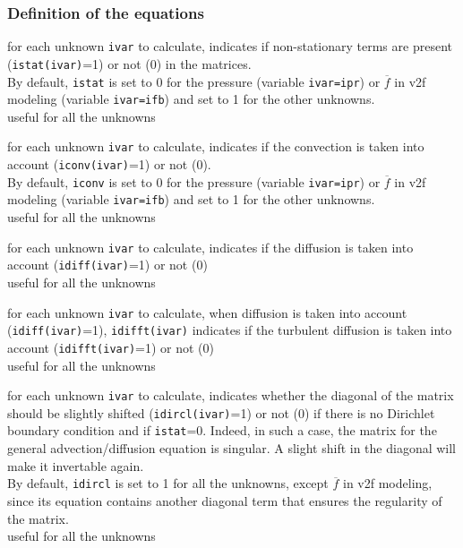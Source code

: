 \subsubsection{Definition of the equations}

{for each unknown {\tt ivar} to calculate, indicates if
non-stationary terms are present ({\tt istat(ivar)}=1) or not (0) in the matrices.\\
By default, {\tt istat} is set to 0 for the pressure (variable {\tt ivar=ipr})
or $\overline{f}$ in v2f modeling (variable {\tt ivar=ifb}) and set to
1 for the other unknowns.\\
useful for all the unknowns}

{for each unknown {\tt ivar} to calculate, indicates if the
convection is taken into account ({\tt iconv(ivar)}=1) or not (0).\\
By default, {\tt iconv} is set to 0 for the pressure (variable {\tt ivar=ipr})
or $\overline{f}$ in v2f modeling (variable {\tt ivar=ifb}) and set to
1 for the other unknowns.\\
useful for all the unknowns}

{for each unknown {\tt ivar} to calculate, indicates if the
diffusion is taken into account ({\tt idiff(ivar)}=1) or not (0)\\
useful for all the unknowns}

{for each unknown {\tt ivar} to calculate, when diffusion is taken
into account ({\tt idiff(ivar)}=1), {\tt idifft(ivar)} indicates if the turbulent
diffusion is taken into account ({\tt idifft(ivar)}=1) or not (0)\\
useful for all the unknowns }

{for each unknown {\tt ivar} to calculate, indicates whether the diagonal
of the matrix should be slightly shifted ({\tt idircl(ivar)}=1) or not (0) if there
is no Dirichlet boundary condition and if {\tt istat}=0. Indeed, in such a case,
the matrix for the general advection/diffusion equation is singular. A slight
shift in the diagonal will make it invertable again.\\
By default, {\tt idircl} is set to 1 for all the unknowns, except $\overline{f}$ in
v2f modeling, since its equation contains another diagonal term that ensures
the regularity of the matrix.\\
useful for all the unknowns}

